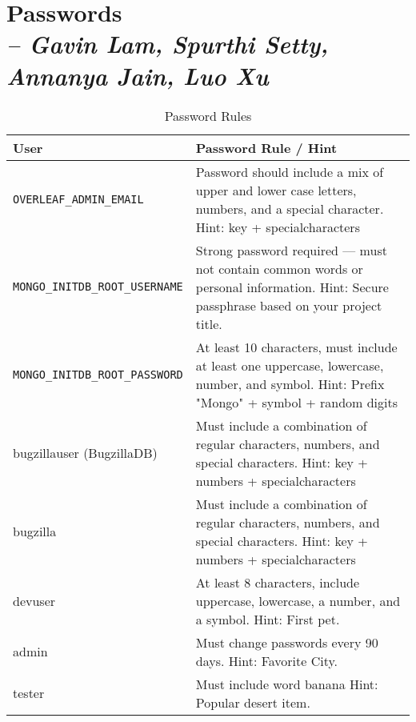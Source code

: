 \chapter{Passwords \\
\small{\textit{-- Gavin Lam, Spurthi Setty, Annanya Jain, Luo Xu}}
\label{Chapter::Passwords}}
\begin{longtable}{|l|p{11cm}|} 
\caption{Password Rules \label{Table::Passwords}}\\
\hline
\textbf{User} & \textbf{Password Rule / Hint} \\
\hline
\endhead


\texttt{OVERLEAF\_ADMIN\_EMAIL} & Password should include a mix of upper and lower case letters, numbers, and a special character.  
Hint: key + specialcharacters 
\\ 
\hline

\texttt{MONGO\_INITDB\_ROOT\_USERNAME} & Strong password required — must not contain common words or personal information.  
Hint: Secure passphrase based on your project title. 
\\ 
\hline

\texttt{MONGO\_INITDB\_ROOT\_PASSWORD} & At least 10 characters, must include at least one uppercase, lowercase, number, and symbol.  
Hint: Prefix "Mongo" + symbol + random digits 
\\ 
\hline

bugzillauser (BugzillaDB) & Must include a combination of regular characters, numbers, and special characters. 
Hint: key + numbers +  specialcharacters
\\ 
\hline

bugzilla & Must include a combination of regular characters, numbers, and special characters. 
Hint: key + numbers +  specialcharacters
\\ 
\hline

devuser & At least 8 characters, include uppercase, 
lowercase, a number, and a symbol. Hint: First pet. 
\\ 
\hline

admin & Must change passwords every 90 days. Hint: Favorite City. 
\\ 
\hline

tester & Must include word banana Hint: Popular desert item. 
\\ 
\hline


\end{longtable}
